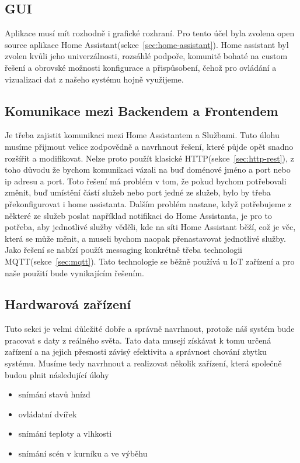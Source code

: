 \subsection{GUI}\label{subsec:gui}
Aplikace musí mít rozhodně i grafické rozhraní.
Pro tento účel byla zvolena open source aplikace Home Assistant(sekce~\ref{sec:home-assistant}).
Home assistant byl zvolen kvůli jeho univerzálnosti, rozsáhlé podpoře, komunitě bohaté na custom řešení a obrovské možnosti konfigurace a přispůsobení, čehož pro ovládání a vizualizaci dat z našeho systému hojně využijeme.

\subsection{Komunikace mezi Backendem a Frontendem}\label{subsec:komunikace-mezi-backendem-a-frontendem}
Je třeba zajistit komunikaci mezi Home Assistantem a Službami.
Tuto úlohu musíme přijmout velice zodpovědně a navrhnout řešení, které půjde opět snadno rozšířit a modifikovat.
Nelze proto použít klasické HTTP(sekce~\ref{sec:http-rest}), z toho důvodu že bychom komunikaci vázali na buď doménové jméno a port nebo ip adresu a port.
Toto řešení má problém v tom, že pokud bychom potřebovali změnit, buď umístění částí služeb nebo port jedné ze služeb, bylo by třeba překonfigurovat i home assistanta.
Dalším problém nastane, když potřebujeme z některé ze služeb poslat například notifikaci do Home Assistanta, je pro to potřeba, aby jednotlivé služby věděli, kde na síti Home Assistant běží, což je věc, která se může měnit, a museli bychom naopak přenastavovat jednotlivé služby.
Jako řešení se nabízí použít messaging konkrétně třeba technologii MQTT(sekce~\ref{sec:mqtt}).
Tato technologie se běžně používá u IoT zařízení a pro naše použití bude vynikajícím řešením.

\subsection{Hardwarová zařízení}\label{subsec:hardwarova-zarizeni}
Tuto sekci je velmi důležité dobře a správně navrhnout, protože náš systém bude pracovat s daty z reálného světa.
Tato data musejí získávat k tomu určená zařízení a na jejich přesnosti závisý efektivita a správnost chování zbytku systému.
Musíme tedy navrhnout a realizovat několik zařízení, která společně budou plnit následující úlohy
\begin{itemize}
    \item snímání stavů hnízd
    \item ovládatní dvířek
    \item snímání teploty a vlhkosti
    \item snímání scén v kurníku a ve výběhu
\end{itemize}
